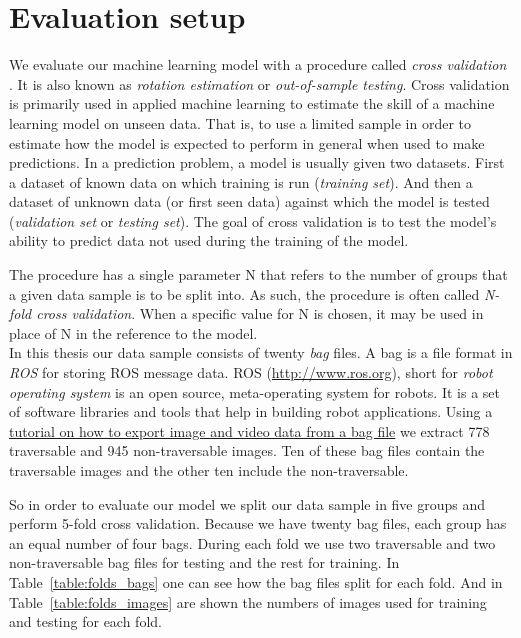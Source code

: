 \documentclass[12pt,a4paper,table,dvipsnames,tikz]{report}
\newcommand{\term}{\textit}
\newcommand{\acronym}{\MakeUppercase}
\newcommand{\bl}[1]{{\hypersetup{linkcolor=blue}#1}}
\begin{document}
	\section{Evaluation setup}
	\label{sec:exp:eval}
	
	We evaluate our machine learning model with a procedure called \term{cross validation} 
	\citep{Brownlee}. It is also known as \term{rotation estimation} or \term{out-of-sample 
	testing}. Cross validation is primarily used in applied machine learning to estimate 
	the skill of a machine learning model on unseen data. That is, to use a limited sample 
	in order to estimate how the model is expected to perform in general when used to make 
	predictions. In a prediction problem, a model is usually given two datasets. First a 
	dataset of known data on which training is run (\term{training set}). And then a dataset 
	of unknown data (or first seen data) against which the model is tested (\term{validation 
	set} or \term{testing set}). The goal of cross validation is to test the model's ability 
	to predict data not used during the training of the model.
	\par
	The procedure has a single parameter N that refers to the number of groups that a given 
	data sample is to be split into. As such, the procedure is often called \term{N-fold 
	cross validation}. When a specific value for N is chosen, it may be used in place of N 
	in the reference to the model. 
	\\
	
	In this thesis our data sample consists of twenty \term{bag} files. A bag is a file 
	format in \term{\acronym{ros}} for storing \acronym{ros} message data. \acronym{ros} 
	(\url{http://www.ros.org}), short for \term{robot operating system} is an open source, 
	meta-operating system for robots. It is a set of software libraries and tools that 
	help in building robot applications. Using a 
	\href{http://wiki.ros.org/rosbag/Tutorials/Exporting%20image%20and%20video%20data}
	{tutorial on how to export image and video data from a bag file} we extract 778 
	traversable and 945 non-traversable images. Ten of these bag files contain the 
	traversable images and the other ten include the non-traversable.
	\par
	So in order to evaluate our model we split our data sample in five groups and perform 
	5-fold cross validation. Because we have twenty bag files, each group has an equal 
	number of four bags. During each fold we use two traversable and two non-traversable 
	bag files for testing and the rest for training. In Table~\bl{\ref{table:folds_bags}} one 
	can see how the bag files split for each fold. And in Table~\bl{\ref{table:folds_images}} 
	are shown the numbers of images used for training and testing for each fold.
	\\
	
\end{document}
